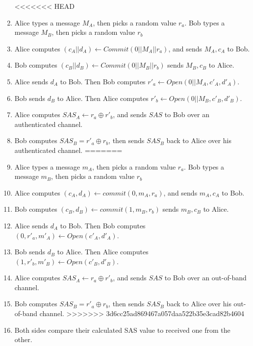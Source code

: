 \begin{enumerate}
<<<<<<< HEAD
\item Alice types a message $M_A$, then picks a random value $r_a$. Bob types a message $M_B$, then picks a random value $r_b$
\item Alice computes $(c_A||d_A) \leftarrow Commit(0||M_A||r_a)$, and sends $M_A, c_A$ to Bob.
\item Bob computes $(c_B||d_B) \leftarrow Commit(0||M_B||r_b)$ sends $M_B, c_B$ to Alice.
\item Alice sends $d_A$ to Bob. Then Bob computes $r'_a \leftarrow Open(0||M_A,c'_A,d'_A)$. 
\item Bob sends $d_B$ to Alice. Then Alice computes $r'_b \leftarrow Open(0||M_B,c'_B,d'_B)$. 
\item Alice computes $SAS_A \leftarrow r_a \oplus r'_b$, and sends $SAS$ to Bob over an authenticated channel. 
\item Bob computes $SAS_B = r'_a \oplus r_b$, then sends $SAS_B$ back to Alice over his authenticated channel. 
=======
\item Alice types a message $m_A$, then picks a random value $r_a$. Bob types a message $m_B$, then picks a random value $r_b$
\item Alice computes $(c_A,d_A) \leftarrow commit(0,m_A,r_a)$, and sends $m_A, c_A$ to Bob.
\item Bob computes $(c_B,d_B) \leftarrow commit(1,m_B,r_b)$ sends $m_B, c_B$ to Alice.
\item Alice sends $d_A$ to Bob. Then Bob computes $(0,r'_a,m'_A) \leftarrow Open(c'_A,d'_A)$. 
\item Bob sends $d_B$ to Alice. Then Alice computes $(1,r'_b,m'_B) \leftarrow Open(c'_B,d'_B)$. 
\item Alice computes $SAS_A \leftarrow r_a \oplus r'_b$, and sends $SAS$ to Bob over an out-of-band channel. 
\item Bob computes $SAS_B = r'_a \oplus r_b$, then sends $SAS_B$ back to Alice over his out-of-band channel. 
>>>>>>> 3d6cc25ad869467a057daa522b35e3cad82b4604
\item Both sides compare their calculated SAS value to received one from the other. 
\end{enumerate}

